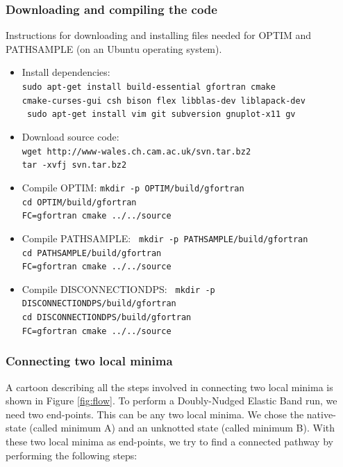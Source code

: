 \documentclass[journal=jacsat]{achemso}
\begin{document}
\subsubsection{Downloading and compiling the code}
Instructions for downloading and installing files needed for OPTIM and PATHSAMPLE (on an Ubuntu operating system).
\begin{itemize}
\setlength\itemsep{0.01em}
    \small
    \item{Install dependencies: \tt{\\ sudo apt-get install build-essential gfortran cmake \\ cmake-curses-gui csh bison flex libblas-dev liblapack-dev\\ \ sudo apt-get install vim git subversion gnuplot-x11 gv}}
    \item {Download source code: \tt{\\ wget http://www-wales.ch.cam.ac.uk/svn.tar.bz2 \\  tar -xvfj svn.tar.bz2}}
    \item{Compile OPTIM: \tt{mkdir -p OPTIM/build/gfortran} \\ cd OPTIM/build/gfortran \\ FC=gfortran cmake ../../source}
    \item{Compile PATHSAMPLE: \tt{ mkdir -p PATHSAMPLE/build/gfortran} \\ cd PATHSAMPLE/build/gfortran \\ FC=gfortran cmake ../../source}
    \item{Compile DISCONNECTIONDPS: \tt{ mkdir -p DISCONNECTIONDPS/build/gfortran} \\ cd DISCONNECTIONDPS/build/gfortran \\ FC=gfortran cmake ../../source}
\end{itemize}


\subsubsection{Connecting two local minima}
A cartoon describing all the steps involved in connecting two local minima is shown in Figure \ref{fig:flow}. To perform a Doubly-Nudged Elastic Band \cite{DNEB1,DNEB2} run, we need two end-points. This can be any two local minima. We chose the native-state (called minimum A) and an unknotted state (called minimum B). With these two local minima as end-points, we try to find a connected pathway by performing the following steps:
\end{document}
